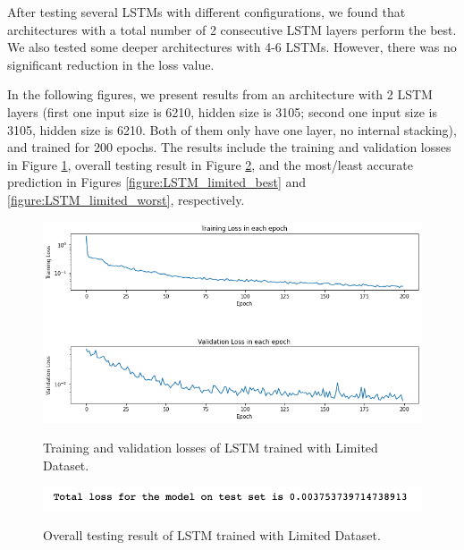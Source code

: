 After testing several LSTMs with different configurations, we found that architectures with a total number of 2 consecutive LSTM layers perform the best. We also tested some deeper architectures with 4-6 LSTMs. However, there was no significant reduction in the loss value.

In the following figures, we present results from an architecture with 2 LSTM layers (first one input size is 6210, hidden size is 3105; second one input size is 3105, hidden size is 6210. Both of them only have one layer, no internal stacking), and trained for 200 epochs. The results include the training and validation losses in Figure \ref{figure:LSTM_limited_losses}, overall testing result in Figure \ref{figure:LSTM_limited_testing}, and the most/least accurate prediction in Figures \ref{figure:LSTM_limited_best} and \ref{figure:LSTM_limited_worst}, respectively.

\begin{figure}[H]
    \caption{Training and validation losses of LSTM trained with Limited Dataset.}
    \includegraphics[scale=0.6]{figures/mantle_convection_images/limited_dataset/LSTM_trainingData.png}
    \label{figure:LSTM_limited_losses}
\end{figure}

\begin{figure}[H]
    \caption{Overall testing result of LSTM trained with Limited Dataset.}
    \includegraphics[scale=0.8]{figures/mantle_convection_images/limited_dataset/LSTM_OverallTesting.png}
    \label{figure:LSTM_limited_testing}
\end{figure}

